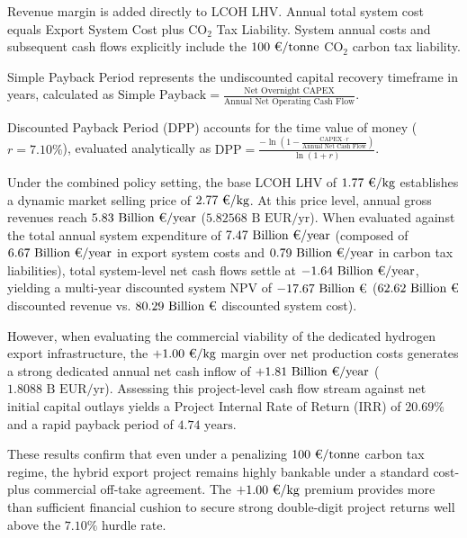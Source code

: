 \documentclass[preprint,12pt]{elsarticle}
\begin{document}
\begin{table}[htbp]
\begin{threeparttable}
\begin{tablenotes}
\footnotesize
\item[*] Revenue margin is added directly to LCOH LHV. Annual total system cost equals Export System Cost plus $\text{CO}_2$ Tax Liability. System annual costs and subsequent cash flows explicitly include the $100\text{~\texteuro/tonne}$ $\text{CO}_2$ carbon tax liability.
\item[a] Simple Payback Period represents the undiscounted capital recovery timeframe in years, calculated as $\text{Simple Payback} = \frac{\text{Net Overnight CAPEX}}{\text{Annual Net Operating Cash Flow}}$.
\item[b] Discounted Payback Period (DPP) accounts for the time value of money ($r = 7.10\%$), evaluated analytically as $\text{DPP} = \frac{-\ln\left(1 - \frac{\text{CAPEX} \cdot r}{\text{Annual Net Cash Flow}}\right)}{\ln(1 + r)}$.
\end{tablenotes}
\end{threeparttable}
\end{table}

Under the combined policy setting, the base LCOH LHV of $1.77\text{~\texteuro/kg}$ establishes a dynamic market selling price of $2.77\text{~\texteuro/kg}$. At this price level, annual gross revenues reach $5.83\text{~Billion~\texteuro/year}$ ($5.82568\text{~B EUR/yr}$). When evaluated against the total annual system expenditure of $7.47\text{~Billion~\texteuro/year}$ (composed of $6.67\text{~Billion~\texteuro/year}$ in export system costs and $0.79\text{~Billion~\texteuro/year}$ in carbon tax liabilities), total system-level net cash flows settle at $-1.64\text{~Billion~\texteuro/year}$, yielding a multi-year discounted system NPV of $-17.67\text{~Billion~\texteuro}$ ($62.62\text{~Billion~\texteuro}$ discounted revenue vs. $80.29\text{~Billion~\texteuro}$ discounted system cost).

However, when evaluating the commercial viability of the dedicated hydrogen export infrastructure, the $+1.00\text{~\texteuro/kg}$ margin over net production costs generates a strong dedicated annual net cash inflow of $+1.81\text{~Billion~\texteuro/year}$ ($1.8088\text{~B EUR/yr}$). Assessing this project-level cash flow stream against net initial capital outlays yields a Project Internal Rate of Return (IRR) of $20.69\%$ and a rapid payback period of $4.74\text{~years}$.

These results confirm that even under a penalizing $100\text{~\texteuro/tonne}$ carbon tax regime, the hybrid export project remains highly bankable under a standard cost-plus commercial off-take agreement. The $+1.00\text{~\texteuro/kg}$ premium provides more than sufficient financial cushion to secure strong double-digit project returns well above the $7.10\%$ hurdle rate.
\end{document}
